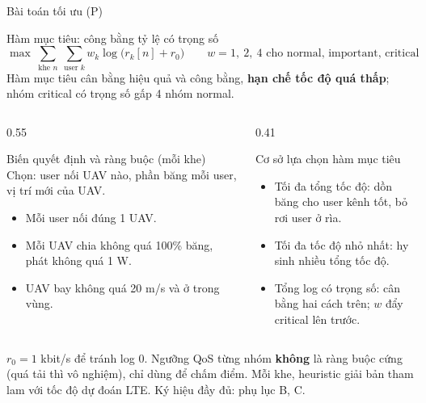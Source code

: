 \documentclass[aspectratio=169,10pt,t]{beamer}
\newcommand{\hl}[1]{\textcolor{MainBlue}{\textbf{#1}}}
\begin{document}
\begin{frame}{Bài toán tối ưu (P)}
\begin{block}{Hàm mục tiêu: công bằng tỷ lệ có trọng số}
\vspace{-3mm}
\[
\max\ \sum_{\text{khe } n}\ \sum_{\text{user } k} w_k \log\big(r_k[n] + r_0\big)
\qquad w = 1,\ 2,\ 4 \text{ cho normal, important, critical}
\]
\small Hàm mục tiêu cân bằng hiệu quả và công bằng, \hl{hạn chế tốc độ quá thấp}; nhóm critical có trọng số gấp 4 nhóm normal.
\end{block}
\begin{columns}[T,onlytextwidth]
\begin{column}{0.55\textwidth}
\vspace{0pt}
  \begin{block}{Biến quyết định và ràng buộc (mỗi khe)}
    \small
    Chọn: user nối UAV nào, phần băng mỗi user, vị trí mới của UAV.
    \begin{itemize}
      \item Mỗi user nối đúng 1 UAV.
      \item Mỗi UAV chia không quá 100\% băng, phát không quá 1 W.
      \item UAV bay không quá 20 m/s và ở trong vùng.
    \end{itemize}
  \end{block}
\end{column}
\begin{column}{0.41\textwidth}
\vspace{0pt}
  \begin{block}{Cơ sở lựa chọn hàm mục tiêu}
    \scriptsize
    \begin{itemize}
      \item Tối đa tổng tốc độ: dồn băng cho user kênh tốt, bỏ rơi user ở rìa.
      \item Tối đa tốc độ nhỏ nhất: hy sinh nhiều tổng tốc độ.
      \item Tổng log có trọng số: cân bằng hai cách trên; $w$ đẩy critical lên trước.
    \end{itemize}
  \end{block}
\end{column}
\end{columns}
\vspace{1mm}
\scriptsize $r_0 = 1$ kbit/s để tránh log 0. Ngưỡng QoS từng nhóm \textbf{không} là ràng buộc cứng (quá tải thì vô nghiệm), chỉ dùng để chấm điểm.
Mỗi khe, heuristic giải bản tham lam với tốc độ dự đoán LTE. Ký hiệu đầy đủ: phụ lục B, C.
\end{frame}
\end{document}
